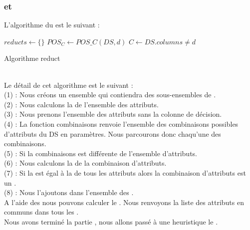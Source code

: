 \subsubsection{\reduct et \core}
L'algorithme du \reduct est le suivant : \\
\begin{algorithm}[h!]
	\SetAlgoLined
	\LinesNumbered
	$reducts \gets \{\}$ \;
	$POS_C \gets POS\_C(DS, d)$ \;
	$C \gets DS.columns \neq d$ \;
	\caption{Algorithme reduct}
\end{algorithm} \\
Le détail de cet algorithme est le suivant : \\
(1) : Nous créons un ensemble qui contiendra des sous-ensembles de
\reduct. \\
(2) : Nous calculons la \posreg de l'ensemble des attributs. \\
(3) : Nous prenons l'ensemble des attributs sans la colonne de
décision. \\
(4) : La fonction combinaisons renvoie l'ensemble des combinaisons
possibles d'attributs du DS en paramètres. Nous parcourons donc
chaqu'une des combinaisons. \\
(5) : Si la combinaisons est différente de l'ensemble d'attributs. \\
(6) : Nous calculons la \posreg de la combinaison d'attributs. \\
(7) : Si la \posreg est égal à la \posreg de tous les attributs alors
la combinaison d'attributs est un \reduct. \\
(8) : Nous l'ajoutons dans l'ensemble des \reduct. \\

A l'aide des \reduct nous pouvons calculer le \core. Nous renvoyons
la liste des attributs en communs dans tous les \reduct. \\

Nous avons terminé la partie \rst, nous allons passé à une heuristique
le \quickreduct. \\

